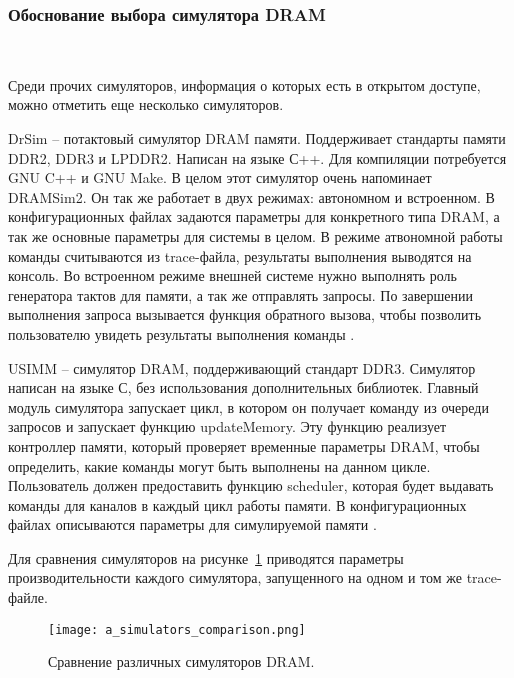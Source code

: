 \subsubsection{Обоснование выбора симулятора DRAM}~\\
\label{page:domain:simulators:simulator_choice}

Среди прочих симуляторов, информация о которых есть в открытом доступе, можно отметить еще несколько симуляторов. 

DrSim – потактовый симулятор DRAM памяти. Поддерживает стандарты памяти DDR2, DDR3 и LPDDR2. Написан на языке С++. Для компиляции потребуется GNU C++ и GNU Make. В целом этот симулятор очень напоминает DRAMSim2. Он так же работает в двух режимах: автономном и встроенном. В конфигурационных файлах задаются параметры для конкретного типа DRAM, а так же основные параметры для системы в целом. В режиме атвономной работы команды считываются из trace-файла, результаты выполнения выводятся на консоль. Во встроенном режиме внешней системе нужно выполнять роль генератора тактов для памяти, а так же отправлять запросы. По завершении выполнения запроса вызывается функция обратного вызова, чтобы позволить пользователю увидеть результаты выполнения команды \cite{drsim_manual}.

USIMM – симулятор DRAM, поддерживающий стандарт DDR3. Симулятор написан на языке С, без использования дополнительных библиотек. Главный модуль симулятора запускает цикл, в котором он получает команду из очереди запросов и запускает функцию updateMemory. Эту функцию реализует контроллер памяти, который проверяет временные параметры DRAM, чтобы определить, какие команды могут быть выполнены на данном цикле. Пользователь должен предоставить функцию scheduler, которая будет выдавать команды для каналов в каждый цикл работы памяти. В конфигурационных файлах описываются параметры для симулируемой памяти \cite{usimm_manual}.
 

Для сравнения симуляторов на рисунке~\ref{fig:domain:simulators:simulator_choice:comparison} приводятся параметры производительности каждого симулятора, запущенного на одном и том же trace-файле.

\begin{figure}[ht]
\centering
  \texttt{[image: a\_simulators\_comparison.png]}  
  \caption{ Сравнение различных симуляторов DRAM. }
  \label{fig:domain:simulators:simulator_choice:comparison}
\end{figure}

